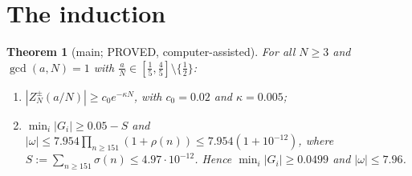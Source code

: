 \documentclass[11pt]{article}
\newtheorem{theorem}{Theorem}\newtheorem{lemma}[theorem]{Lemma}\newtheorem{proposition}[theorem]{Proposition}
\theoremstyle{definition}\newtheorem{definition}[theorem]{Definition}
\theoremstyle{remark}\newtheorem{remark}[theorem]{Remark}
\begin{document}
\section{The induction}\label{sec:ind}
\begin{theorem}[main; PROVED, computer-assisted]\label{thm:main}
For all $N\ge3$ and $\gcd(a,N)=1$ with $\frac aN\in[\frac15,\frac45]\setminus\{\frac12\}$:
\begin{enumerate}
\item[(M$^\pm$)] $|Z^\pm_N(a/N)|\ge c_0e^{-\kappa N}$, with $c_0=0.02$ and $\kappa=0.005$;
\item[($\Omega$)] $\min_i|G_i|\ge0.05-S$ and $|\omega|\le7.954\prod_{n\ge151}(1+\rho(n))\le7.954(1+10^{-12})$, where $S:=\sum_{n\ge151}\sigma(n)\le4.97\cdot10^{-12}$. Hence $\min_i|G_i|\ge0.0499$ and $|\omega|\le7.96$.
\end{enumerate}
\end{theorem}
\end{document}
